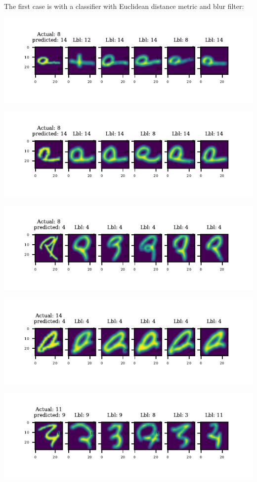 \documentclass[11pt]{article}
\begin{document}
The first case is with a classifier with Euclidean distance metric and blur filter:

\includegraphics{figures/1i[1]_miss_classified_0.pdf}

\includegraphics{figures/1i[1]_miss_classified_1.pdf}

\includegraphics{figures/1i[1]_miss_classified_2.pdf}

\includegraphics{figures/1i[1]_miss_classified_3.pdf}

\includegraphics{figures/1i[1]_miss_classified_4.pdf}
\end{document}
